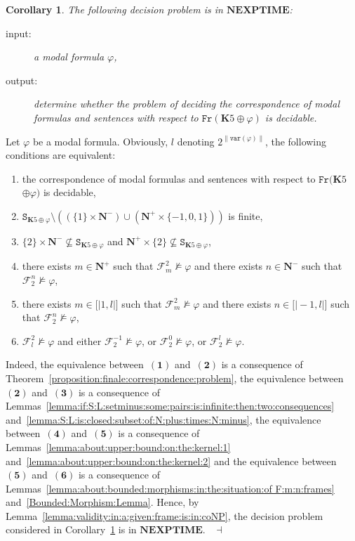 \documentclass[draft]{article}
\newtheorem{corollary}{Corollary}
\newenvironment{proof}{{\bf Proof:}}{~$\dashv$\\}
\def\lsem{{\lbrack\mid}}
\def\rsem{{\mid\rbrack}}
\def\Fr{\mathtt{Fr}}
\def\NEXPTIME{\mathbf{NEXPTIME}}
\def\vvar{\mathtt{var}}
\def\K{\mathbf{K}}
\begin{document}
%
%
\begin{corollary}\label{corollary:correspondence:complexity}
%
%
The following decision problem is in $\NEXPTIME$:
%
%
\begin{description}
%
%
\item[input:] a modal formula $\varphi$,
%
%
\item[output:] determine whether the problem of deciding the correspondence of modal formulas and sentences with respect to $\Fr(\K5{\oplus}\varphi)$ is decidable.
%
%
\end{description}
%
%
\end{corollary}
%
%
\begin{proof}
%
%
Let $\varphi$ be a modal formula.
Obviously, $l$ denoting $2^{{\parallel}\vvar(\varphi){\parallel}}$, the following conditions are equivalent:
%
%
\begin{enumerate}
%
%
\item the correspondence of modal formulas and sentences with respect to $\Fr(\K5
%
%
%
%
%
%
%
%
%
%
%
%
$\linebreak$
%
%
%
%
%
%
%
%
%
%
%
%
{\oplus}\varphi)$ is decidable,
%
%
\item $\mathtt{S}_{\K5{\oplus}\varphi}{\setminus}((\{1\}{\times}\mathbf{N}^{-}){\cup}(\mathbf{N}^{+}{\times}\{{-}1,0,1\}))$ is finite,
%
%
\item $\{2\}{\times}\mathbf{N}^{-}{\not\subseteq}\mathtt{S}_{\K5{\oplus}\varphi}$ and $\mathbf{N}^{+}{\times}\{2\}{\not\subseteq}\mathtt{S}_{\K5{\oplus}\varphi}$,
%
%
\item there exists $m{\in}\mathbf{N}^{+}$ such that ${\mathcal F}_{m}^{2}{\not\models}\varphi$ and there exists $n{\in}\mathbf{N}^{-}$ such that ${\mathcal F}_{2}^{n}{\not\models}\varphi$,
%
%
\item there exists $m{\in}\lsem1,l\rsem$ such that ${\mathcal F}_{m}^{2}{\not\models}\varphi$ and there exists $n{\in}\lsem{-}1,l\rsem$ such that ${\mathcal F}_{2}^{n}{\not\models}\varphi$,
%
%
\item ${\mathcal F}_{l}^{2}{\not\models}\varphi$ and either ${\mathcal F}_{2}^{{-}1}{\not\models}\varphi$, or ${\mathcal F}_{2}^{0}{\not\models}\varphi$, or ${\mathcal F}_{2}^{l}{\not\models}\varphi$.
%
%
\end{enumerate}
%
%
Indeed, the equivalence between~$\mathbf{(1)}$ and~$\mathbf{(2)}$ is a consequence of Theorem~\ref{proposition:finale:correspondence:problem}, the equivalence between~$\mathbf{(2)}$ and~$\mathbf{(3)}$ is a consequence of Lemmas~\ref{lemma:if:S:L:setminus:some:pairs:is:infinite:then:two:consequences} and~\ref{lemma:S:L:is:closed:subset:of:N:plus:times:N:minus}, the equivalence between~$\mathbf{(4)}$ and~$\mathbf{(5)}$ is a consequence of Lemmas~\ref{lemma:about:upper:bound:on:the:kernel:1} and~\ref{lemma:about:upper:bound:on:the:kernel:2} and the equivalence between~$\mathbf{(5)}$ and~$\mathbf{(6)}$ is a consequence of Lemmas~\ref{lemma:about:bounded:morphisms:in:the:situation:of F:m:n:frames} and~\ref{Bounded:Morphism:Lemma}.
Hence, by Lemma~\ref{lemma:validity:in:a:given:frame:is:in:coNP}, the decision problem considered in Corollary~\ref{corollary:correspondence:complexity} is in $\NEXPTIME$.
%
%
\medskip
%
%
\end{proof}
\end{document}
